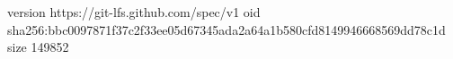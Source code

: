 version https://git-lfs.github.com/spec/v1
oid sha256:bbc0097871f37c2f33ee05d67345ada2a64a1b580cfd8149946668569dd78c1d
size 149852
